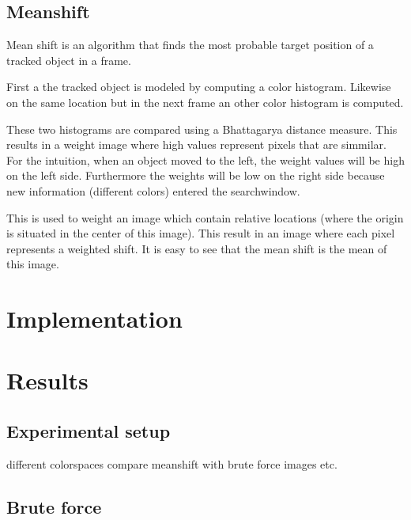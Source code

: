 \documentclass[a4paper,11pt]{article}
\begin{document}
	
	\subsection{Meanshift}
	Mean shift is an algorithm that finds the most probable target position of a
	tracked object in a frame.

	First a the tracked object is modeled by computing a color histogram.
	Likewise on the same location but in the next frame an other color histogram is
	computed.

	These two histograms are compared using a Bhattagarya distance measure. This
	results in a weight image where high values represent pixels that are
	simmilar.  For the intuition, when an object moved to the left, the weight
	values will be high on the left side. Furthermore the weights will be low on
	the right side because new information (different colors) entered the
	searchwindow. 

	This is used to weight an image which contain relative locations
	(where the origin is situated in the center of this image). This result in
	an image where each pixel represents a weighted shift. It is easy to see
	that the mean shift is the mean of this image.
	




\section{Implementation}

\section{Results} 
	\subsection{Experimental setup} 
	different colorspaces
	compare meanshift with brute force
	images etc.
	\subsection{Brute force} 
\end{document}
